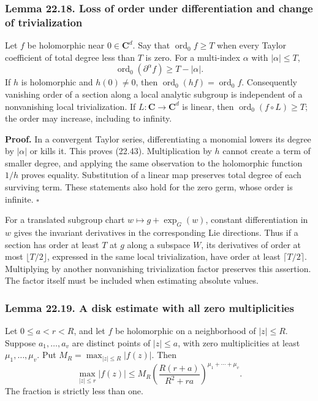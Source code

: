 \documentclass[
  11pt,
  a4paper,
]{article}
\begin{document}
\subsubsection{Lemma 22.18. Loss of order under differentiation and
change of
trivialization}\label{lemma-22.18.-loss-of-order-under-differentiation-and-change-of-trivialization}

Let \(f\) be holomorphic near \(0\in\mathbf C^d\). Say that
\(\operatorname{ord}_0 f\ge T\) when every Taylor coefficient of total
degree less than \(T\) is zero. For a multi-index \(\alpha\) with
\(|\alpha|\le T\), \[
 \operatorname{ord}_0(\partial^\alpha f)\ge T-|\alpha|.
 \tag{22.43}
\] If \(h\) is holomorphic and \(h(0)\ne0\), then
\(\operatorname{ord}_0(hf)=\operatorname{ord}_0 f\). Consequently
vanishing order of a section along a local analytic subgroup is
independent of a nonvanishing local trivialization. If
\(L:\mathbf C\to\mathbf C^d\) is linear, then
\(\operatorname{ord}_0(f\circ L)\ge T\); the order may increase,
including to infinity.

\textbf{Proof.} In a convergent Taylor series, differentiating a
monomial lowers its degree by \(|\alpha|\) or kills it. This proves
(22.43). Multiplication by \(h\) cannot create a term of smaller degree,
and applying the same observation to the holomorphic function \(1/h\)
proves equality. Substitution of a linear map preserves total degree of
each surviving term. These statements also hold for the zero germ, whose
order is infinite. \(\square\)

For a translated subgroup chart \(w\mapsto g+\exp_G(w)\), constant
differentiation in \(w\) gives the invariant derivatives in the
corresponding Lie directions. Thus if a section has order at least \(T\)
at \(g\) along a subspace \(W\), its derivatives of order at most
\(\lfloor T/2\rfloor\), expressed in the same local trivialization, have
order at least \(\lceil T/2\rceil\). Multiplying by another nonvanishing
trivialization factor preserves this assertion. The factor itself must
be included when estimating absolute values.

\subsubsection{Lemma 22.19. A disk estimate with all zero
multiplicities}\label{lemma-22.19.-a-disk-estimate-with-all-zero-multiplicities}

Let \(0\le a<r<R\), and let \(f\) be holomorphic on a neighborhood of
\(|z|\le R\). Suppose \(a_1,\ldots,a_v\) are distinct points of
\(|z|\le a\), with zero multiplicities at least \(\mu_1,\ldots,\mu_v\).
Put \(M_R=\max_{|z|\le R}|f(z)|\). Then \[
 \max_{|z|\le r}|f(z)|
 \le M_R\left(\frac{R(r+a)}{R^2+ra}\right)^{\mu_1+\cdots+\mu_v}.
 \tag{22.44}
\] The fraction is strictly less than one.
\end{document}
